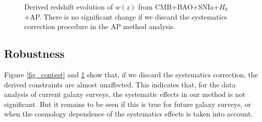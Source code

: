 \documentclass[iop]{emulateapj}
\begin{document}
\begin{figure}
   \caption{\label{fig_wz_sys}
   Derived redshift evolution of $w(z)$ from CMB+BAO+SNIa+$H_0$+AP.
   There is no significant change if we discard the systematics correction procedure in the AP method analysis.
   }
\end{figure}

\subsection{Robustness}

Figure \ref{fig_contest} and \ref{fig_wz_sys} show that,
if we discard the systematics correction, %
the derived constraints are almost unaffected.
This indicates that, for the data analysis of current galaxy surveys,
the systematic effects in our method is not significant. 
But it remains to be seen if this is true for future galaxy surveys,
or when the cosmology dependence of the systematics effects is taken into account.
\end{document}
